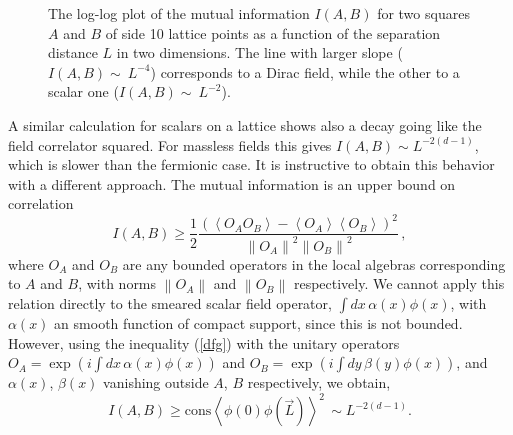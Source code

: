 \documentclass[11pt]{article}
\begin{document}
\begin{figure} [tbp]
\centering
\leavevmode
\epsfysize=5.3cm
\bigskip
{}
\caption{The log-log plot of the mutual information $I(A,B)$ for two squares $A$ and $B$ of side 10 lattice points as a function of the separation distance $L$ in two dimensions. The line with larger slope ($I(A,B)\sim~L^{-4}$) corresponds to a Dirac field, while the other to a scalar one ($I(A,B)\sim~L^{-2}$).}
\end{figure}

A similar calculation for scalars on a lattice  shows also a decay going like the field correlator squared. For massless fields this gives $I(A,B)\sim L^{-2(d-1)}$, which is slower than the fermionic case. It is instructive to obtain this behavior with a different approach. The mutual information is an upper bound on correlation \cite{upper}
\begin{equation}
I(A,B)\ge \frac{1}{2}\frac{\left(\left<O_A O_B\right>-\left<O_A\right>\left<O_B\right>\right)^2}{\left\|O_A\right\|^2\left\|O_B\right\|^2}\label{dfg}\,,
\end{equation}
where $O_A$ and $O_B$ are any bounded operators in the local algebras corresponding to $A$ and $B$, with norms $\left\|O_A\right\|$ and $\left\|O_B\right\|$ respectively. We cannot apply this relation directly to the smeared scalar field operator, $\int dx \,\alpha(x) \phi(x)$, with $\alpha(x)$ an smooth function of compact support, since this is not bounded. However, using the inequality (\ref{dfg}) with the unitary operators $O_A=\exp{(i  \int dx \,\alpha(x) \phi(x))}$ and $O_B=\exp(i \int dy \, \beta(y) \phi(x))$, and $\alpha(x)$, $\beta(x)$ vanishing outside $A$, $B$ respectively, we obtain, 
\begin{equation}
I(A,B)\ge \textrm{cons} \left<\phi(0) \phi(\vec{L})\right>^2\,\sim L^{-2(d-1)}.
\end{equation} 
\end{document}
